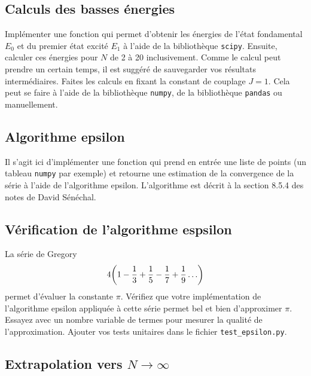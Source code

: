 \documentclass[12pt, letterpaper]{article}
\begin{document}
\subsection{Calculs des basses énergies}\label{subsec:calculs-des-basses-energies}

\noindent Implémenter une fonction qui permet d'obtenir les énergies de l'état fondamental
$E_0$ et du premier état excité $E_1$ à l'aide de la bibliothèque \texttt{scipy}.
Ensuite, calculer ces énergies pour $N$ de 2 à 20 inclusivement.
Comme le calcul peut prendre un certain temps, il est suggéré de
sauvegarder vos résultats intermédiaires.
Faites les calculs en fixant la constant de couplage $J = 1$.
Cela peut se faire à l'aide de la bibliothèque \texttt{numpy},
de la bibliothèque \texttt{pandas} ou manuellement.


\subsection{Algorithme epsilon}\label{subsec:algorithme-epsilon}

\noindent Il s'agit ici d'implémenter une fonction qui prend en entrée
une liste de points (un tableau \texttt{numpy} par exemple) et
retourne une estimation de la convergence de la série à l'aide
de l'algorithme epsilon.
L'algorithme est décrit à la section 8.5.4 des notes de David Sénéchal.


\subsection{Vérification de l'algorithme espsilon}\label{subsec:verification-de-l'algorithme-espsilon}

\noindent La série de Gregory
\begin{equation}
  4\qty(1 - \frac{1}{3} + \frac{1}{5} - \frac{1}{7} + \frac{1}{9} \ldots)
\end{equation}
permet d'évaluer la constante $\pi$.
Vérifiez que votre implémentation de l'algorithme epsilon appliquée à
cette série permet bel et bien d'approximer $\pi$.
Essayez avec un nombre variable de termes pour mesurer la qualité de l'approximation.
Ajouter vos tests unitaires dans le fichier \texttt{test\_epsilon.py}.


\subsection{Extrapolation vers $N \to \infty$}\label{subsec:extrapolation-vers-n-to-infty}
\end{document}
